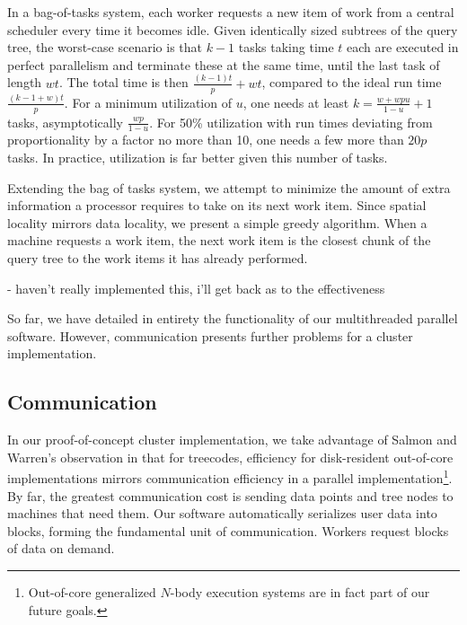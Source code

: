 \documentclass[times, leqno,twocolumn]{article}
\begin{document}
In a bag-of-tasks system, each worker requests a new item of work from a central scheduler every time it becomes idle.
Given identically sized subtrees of the query tree, the worst-case scenario is that $k - 1$ tasks taking time $t$ each are executed in perfect parallelism and terminate these at the same time, until the last task of length $wt$.
The total time is then $\frac{(k-1)t}{p}+wt$, compared to the ideal run time $\frac{(k-1+w)t}{p}$.
For a minimum utilization of $u$, one needs at least $k = \frac{w+wpu}{1-u}+1$ tasks, asymptotically $\frac{wp}{1-u}$.
For 50\% utilization with run times deviating from proportionality by a factor no more than 10, one needs a few more than $20p$ tasks.
In practice, utilization is far better given this number of tasks.

Extending the bag of tasks system, we attempt to minimize the amount of extra information a processor requires to take on its next work item.
Since spatial locality mirrors data locality, we present a simple greedy algorithm.
When a machine requests a work item, the next work item is the closest chunk of the query tree to the work items it has already performed.

- haven't really implemented this, i'll get back as to the effectiveness


So far, we have detailed in entirety the functionality of our multithreaded parallel software.
However, communication presents further problems for a cluster implementation.

\subsection{Communication}

In our proof-of-concept cluster implementation, we take advantage of Salmon and Warren's observation in \cite{salmon97parallel} that for treecodes, efficiency for disk-resident out-of-core implementations mirrors communication efficiency in a parallel implementation\footnote{Out-of-core generalized $N$-body execution systems are in fact part of our future goals.}.
By far, the greatest communication cost is sending data points and tree nodes to machines that need them.
Our software automatically serializes user data into blocks, forming the fundamental unit of communication.
Workers request blocks of data on demand.
\end{document}
